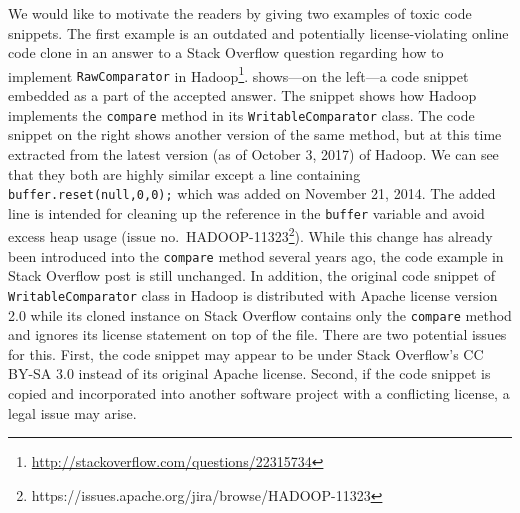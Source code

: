 \documentclass[10pt,journal,compsoc]{IEEEtran}
\begin{document}
We would like to motivate the readers by giving two examples of toxic code
snippets. The first example is an outdated and potentially license-violating
online code clone in an answer to a Stack Overflow question regarding how to
implement {\small{\texttt{RawComparator}}} in
\textsf{Hadoop}\footnote{\url{http://stackoverflow.com/questions/22315734}}.
 shows---on the left---a code snippet embedded as a part
of the accepted answer. The snippet shows how \textsf{Hadoop} implements the
{\small{\texttt{compare}}} method in its {\small{\texttt{WritableComparator}}}
class. The code snippet on the right shows another version of the same method,
but at this time extracted from the latest version (as of October 3, 2017) of
\textsf{Hadoop}. We can see that they both are highly similar except a line
containing {\small{\verb|buffer.reset(null,0,0);|}} which was added on November
21, 2014. The added line is intended for cleaning up the reference in the
{\small{\verb|buffer|}} variable and avoid excess heap usage (issue
no.~HADOOP-11323\footnote{https://issues.apache.org/jira/browse/HADOOP-11323}).
While this change has already been introduced into the
{\small{\texttt{compare}}} method several years ago, the code example in Stack
Overflow post is still unchanged. %
In addition, the original code snippet of {\small\texttt{WritableComparator}}
class in Hadoop is distributed with Apache license version 2.0 while its cloned
instance on Stack Overflow contains only the {\small{\texttt{compare}}} method
and ignores its license statement on top of the file. There are two potential
issues for this. First, the code snippet may appear to be under Stack Overflow's
CC BY-SA 3.0 instead of its original Apache license. Second, if the code snippet
is copied and incorporated into another software project with a conflicting
license, a legal issue may arise.
\end{document}
